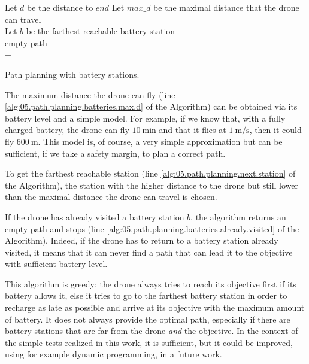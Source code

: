 \begin{algorithm}[H]
    \begin{algorithmic}[1]
            \State Let $d$ be the distance to $end$
            \State Let $max\_d$ be the maximal distance that the drone can travel \label{alg:05.path.planning.batteries.max.d} \\
                \State \Return {}
            \Else
                \State Let $b$ be the farthest reachable battery station \label{alg:05.path.planning.next.station} \\
                 \label{alg:05.path.planning.batteries.already.visited}
                    \State \Return empty path
                \EndIf \\
                \State \Return {} + 
            \EndIf
        \EndFunction
    \end{algorithmic}
    \caption{Path planning with battery stations.}
    \label{alg:05.path.planning.batteries}
\end{algorithm}

The maximum distance the drone can fly (line \ref{alg:05.path.planning.batteries.max.d} of the Algorithm) can be obtained via its battery level and a simple model. For example, if we know that, with a fully charged battery, the drone can fly $\SI{10}{\minute}$ and that it flies at $\SI{1}{\meter\per\second}$, then it could fly $\SI{600}{\meter}$. This model is, of course, a very simple approximation but can be sufficient, if we take a safety margin, to plan a correct path.

To get the farthest reachable station (line \ref{alg:05.path.planning.next.station} of the Algorithm), the station with the higher distance to the drone but still lower than the maximal distance the drone can travel is chosen.

If the drone has already visited a battery station $b$, the algorithm returns an empty path and stops (line \ref{alg:05.path.planning.batteries.already.visited} of the Algorithm). Indeed, if the drone has to return to a battery station already visited, it means that it can never find a path that can lead it to the objective with sufficient battery level.

This algorithm is greedy: the drone always tries to reach its objective first if its battery allows it, else it tries to go to the farthest battery station in order to recharge as late as possible and arrive at its objective with the maximum amount of battery. It does not always provide the optimal path, especially if there are battery stations that are far from the drone \emph{and} the objective. In the context of the simple tests realized in this work, it is sufficient, but it could be improved, using for example dynamic programming, in a future work.

